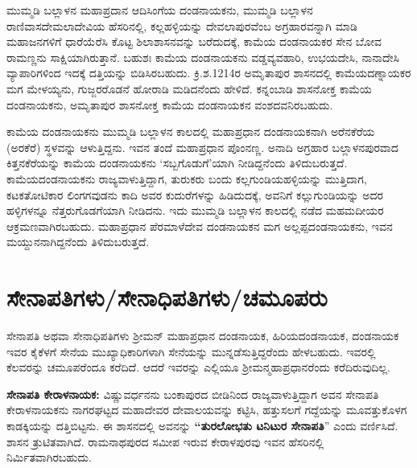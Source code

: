 ಮುಮ್ಮಡಿ ಬಲ್ಲಾಳನ ಮಹಾಪ್ರದಾನ ಆದಿಸಿಂಗೆಯ ದಂಡನಾಯಕನು, ಮುಮ್ಮಡಿ ಬಲ್ಲಾಳನ ರಾಣಿವಾಸ\break ದೇಮಲಾದೇವಿಯ ಹೆಸರಿನಲ್ಲಿ, ಕಲ್ಲಹಳ್ಳಿಯನ್ನು ದೇವಲಾಪುರವೆಂಬ ಅಗ್ರಹಾರವನ್ನಾಗಿ ಮಾಡಿ ಮಹಾಜನಗಳಿಗೆ ಧಾರೆಯೆರೆಸಿ ಕೊಟ್ಟ ಶಿಲಾಶಾಸನವನ್ನು ಬರೆದುದಕ್ಕೆ, ಕಾಮೆಯ ದಂಡನಾಯಕರ ಸೇನ ಬೋವ ರಾಮಣ್ಣನು ಸಾಕ್ಷಿಯಾಗಿರುತ್ತಾನೆ. ಬಹುಶಃ ಕಾಮೆಯ ದಂಡನಾಯಕನು ವಡ್ಡವ್ಯವಹಾರಿ, ಉಭಯದೇಸಿ, ನಾನಾದೇಸಿ ವ್ಯಾಪಾರಿಗಳಿಂದ ಇದಕ್ಕೆ ದತ್ತಿಯನ್ನು ಬಿಡಿಸಿರಬಹುದು. ಕ್ರಿ.ಶ.1214ರ ಅಮೃತಾಪುರ ಶಾಸನದಲ್ಲಿ ಕಾಮೆಯದಣ್ನಾಯಕರ ಮಗ ಮೇಳಯ್ಯನು, ಗುಜ್ಜರರೊಡನೆ ಹೋರಾಡಿ ಮಡಿದನೆಂದು ಹೇಳಿದೆ. ಕನ್ನಂಬಾಡಿ ಶಾಸನೋಕ್ತ ಕಾಮೆಯ ದಂಡನಾಯಕನು, ಅಮೃತಾಪುರ ಶಾಸನೋಕ್ತ ಕಾಮೆಯ ದಂಡನಾಯಕನ ವಂಶದವನಿರಬಹುದು.

ಕಾಮೆಯ ದಂಡನಾಯಕನು ಮುಮ್ಮಡಿ ಬಲ್ಲಾಳನ ಕಾಲದಲ್ಲಿ ಮಹಾಪ್ರಧಾನ ದಂಡನಾಯಕನಾಗಿ ಅರೆನಕೆರೆಯ (ಅರಕೆರೆ) ಸ್ಥಳವನ್ನು ಆಳುತ್ತಿದ್ದನು. ಇವನ ತಂದೆ ಮಹಾಪ್ರಧಾನ ಪೊಂನಣ್ಣ. ಅನಾದಿ ಅಗ್ರಹಾರ ಬಲ್ಲಾಳನಪುರವಾದ ಕಿತ್ತನಕೆರೆಯನ್ನು ಕಾಮೆಯ ದಂಡನಾಯಕನು ‘ಸಬ್ಬಗೊಡುಗೆ’ಯಾಗಿ ನೀಡಿದ್ದನೆಂದು ತಿಳಿದುಬರುತ್ತದೆ. ಕಾಮೆಯದಂಡ\-ನಾಯಕನು ರಾಜ್ಯವಾಳುತ್ತಿದ್ದಾಗ, ತುರುಕರು ಬಂದು ಕಲ್ಲಗುಂಡಿಯಹಳ್ಳಿಯನ್ನು ಮುತ್ತಿದಾಗ, ಕಟಕತೋಟಿಕಾರ ಲಿಂಗಗವುಡನು ಕಾದಿ ಅವರ ಕುದುರೆಗಳನ್ನು ಹಿಡಿದುದಕ್ಕೆ, ಅವನಿಗೆ ಕಲ್ಲುಗುಂಡಿಯನ್ನು ಅದರ ಹಳ್ಳಿಗಳನ್ನೂ ನೆತ್ತರುಗೊಡಗೆಯಾಗಿ ನೀಡಿದನು. ಇದು ಮುಮ್ಮಡಿ ಬಲ್ಲಾಳನ ಕಾಲದಲ್ಲಿ ನಡೆದ ಮಹಮದೀಯರ ಆಕ್ರಮಣವಾಗಿರಬಹುದು. ಮಹಾಪ್ರಧಾನ ಪೆರಮಾಳೆದೇವ ದಂಡನಾಯಕನ ಮಗ ಅಲ್ಲಪ್ಪದಂಡನಾಯಕನು, ಇವನ ಮಯ್ದುನನಾಗಿದ್ದನೆಂದು ತಿಳಿದುಬರುತ್ತದೆ.


\section{ಸೇನಾಪತಿಗಳು/ಸೇನಾಧಿಪತಿಗಳು/ಚಮೂಪರು}

ಸೇನಾಪತಿ ಅಥವಾ ಸೇನಾಧಿಪತಿಗಳು ಶ‍್ರೀಮನ್​ ಮಹಾಪ್ರಧಾನ ದಂಡನಾಯಕ, ಹಿರಿಯದಂಡನಾಯಕ, ದಂಡನಾಯಕ ಇವರ ಕೈಕೆಳಗೆ ಸೇನೆಯ ಮುಖ್ಯಾಧಿಕಾರಿಗಳಾಗಿ ಸೇನೆಯನ್ನು ಮುನ್ನಡೆಸುತ್ತಿದ್ದರೆಂದು ಹೇಳಬಹುದು. ಇವರಲ್ಲಿ ಕೆಲವರನ್ನು ಚಮೂಪರೆಂದೂ ಕರೆದಿದೆ. ಆದರೆ ಇವರನ್ನು ಎಲ್ಲಿಯೂ ಶ‍್ರೀಮನ್ಮಹಾಪ್ರಧಾನರೆಂದು ಕರೆದಿರುವುದಿಲ್ಲ.

\vskip 4pt

\textbf{ಸೇನಾಪತಿ ಕೇರಾಳನಾಯಕ:} ವಿಷ್ಣುವರ್ಧನನು ಬಂಕಾಪುರದ ಬೀಡಿನಿಂದ ರಾಜ್ಯವಾಳುತ್ತಿದ್ದಾಗ ಅವನ ಸೇನಾಪತಿ ಕೇರಾಳನಾಯಕನು ನಾಗರಘಟ್ಟದ ಮಹಾದೇವರ ದೇವಾಲಯವನ್ನು ಕಟ್ಟಿಸಿ, ಹತ್ತುಸಲಗೆ ಗದ್ದೆಯನ್ನು ಮೂವತ್ತುಕೊಳಗ ಕಾಡಕ್ಕಿಯನ್ನು ದತ್ತಿಬಿಟ್ಟನು. ಈ ಶಾಸನದಲ್ಲಿ ಅವನನ್ನು \textbf{“ತುರಲೋಭತು ಟನಿಟುರ ಸೇನಾಪತಿ}” ಎಂದು ವರ್ಣಿಸಿದೆ. ಶಾಸನ ತ್ರುಟಿತವಾಗಿದೆ. ರಾಮನಾಥಪುರದ ಸಮೀಪ ಇರುವ ಕೇರಾಳಪುರವು ಇವನ ಹೆಸರಿನಲ್ಲಿ ನಿರ್ಮಿತವಾಗಿರಬಹುದು.

